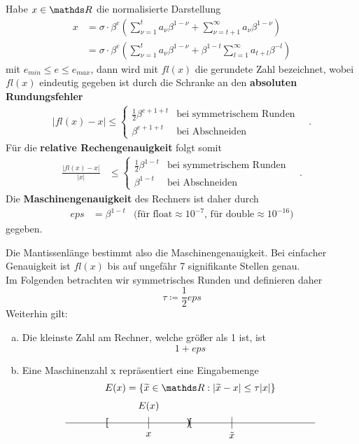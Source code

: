  \label{3.1.6}
Habe $x\in \R $ die normalisierte Darstellung
\begin{align*}
  x &= \sigma \cdot \beta^e (\sum_{\nu=1}^{t}a_{\nu}\beta^{1-\nu} + \sum_{\nu=t+1}^{\infty}a_{\nu}\beta^{1-\nu} ) \\
    &= \sigma \cdot \beta^e (\sum_{\nu=1}^{t}a_{\nu}\beta^{1-\nu} + \beta^{1-t}\sum_{l=1}^{\infty}a_{t+l}\beta^{-l} )
\end{align*}
mit $e_{min} \leq e \leq e_{max}$, dann wird mit $fl(x)$ die gerundete Zahl bezeichnet, wobei $fl(x)$ 
eindeutig gegeben ist durch die Schranke an den \textbf{absoluten Rundungsfehler} 
\begin{align*}
  | fl(x) - x | \leq \begin{cases}
    \frac{1}{2}\beta^{e+1+t} & \text{bei symmetrischem Runden}\\
    \beta^{e+1+t}                    & \text{bei Abschneiden}
  \end{cases} \quad .
\end{align*}
Für die \textbf{relative Rechengenauigkeit} folgt somit 
\begin{align*}
  \frac{| fl(x) - x | }{|x|} & \leq \begin{cases}
    \frac{1}{2}\beta^{1-t} & \text{bei symmetrischem Runden}\\
    \beta^{1-t}                    & \text{bei Abschneiden}
  \end{cases} \quad .
\end{align*}
Die \textbf{Maschinengenauigkeit}  des Rechners ist daher durch 
\begin{align*}
  eps &= \beta^{1-t} & \text{(für float}\approx 10^{-7}  \text{, für double} \approx10^{-16} )
\end{align*}
gegeben.

Die Mantissenlänge bestimmt also die Maschinengenauigkeit. Bei einfacher Genauigkeit ist $fl(x)$ bis auf ungefähr 7 signifikante Stellen genau. \\
Im Folgenden betrachten wir symmetrisches Runden und definieren daher
\[ \tau \coloneqq \frac{1}{2}eps\]
Weiterhin gilt:
\begin{enumerate}[a)]
\item Die kleinste Zahl am Rechner, welche größer als 1 ist, ist
  \[ 1 + eps \]
\item Eine Maschinenzahl x repräsentiert eine Eingabemenge
  \begin{gather*}
    E(x) = \{\widetilde{x} \in \R : |\widetilde{x}-x| \leq \tau|x|\} \\
%
	\begin{tikzpicture}[scale=3]
	\draw(0,0)--(3,0);
	\foreach \x/\xtext in {1/{$x$},2/{$\tilde{x}$}}
	\draw(\x,2pt)--(\x,-2pt) node[below] {\xtext};
	\foreach \x/\xtext in {0.5/[,1.48/),1.5/[}
	\node at (\x,0) {\bfseries \xtext};
	\node at (1,0.2) {$E(x)$};
	\end{tikzpicture}
  \end{gather*}
\end{enumerate}

